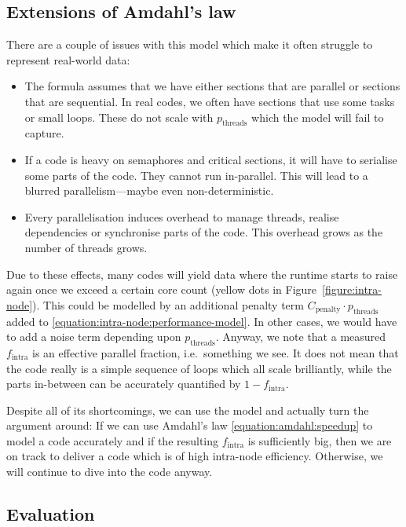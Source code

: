 \subsection{Extensions of Amdahl's law}


There are a couple of issues with this model which make it often struggle to
represent real-world data:

\begin{itemize}
  \item The formula assumes that we have either sections that are parallel or
  sections that are sequential. In real codes, we often have sections that use
  some tasks or small loops. These do not scale with $p_{\text{threads}}$ which
  the model will fail to capture. 
  \item If a code is heavy on semaphores and critical sections, it will have to
  serialise some parts of the code. They cannot run in-parallel. This will lead
  to a blurred parallelism---maybe even non-deterministic.
  \item Every parallelisation induces overhead to manage threads, realise
  dependencies or synchronise parts of the code. This overhead grows as the
  number of threads grows.
\end{itemize}



\noindent
Due to these effects, many codes will yield data where the runtime starts to
raise again once we exceed a certain core count (yellow dots in Figure~\ref{figure:intra-node}).
This could be modelled by an additional penalty term $C_{\text{penalty}} \cdot p_{\text{threads}} $ added to \eqref{equation:intra-node:performance-model}.
In other cases, we would have to add a noise term depending upon
$p_{\text{threads}}$.
Anyway, we note that a measured $f_{\text{intra}}$ is an effective parallel
fraction, i.e.~something we see. 
It does not mean that the code really is a simple sequence of loops which all
scale brilliantly, while the parts in-between can be accurately quantified by
$1-f_{\text{intra}}$.


Despite all of its shortcomings, we can use the model and actually turn the
argument around:
If we can use Amdahl's law \eqref{equation:amdahl:speedup} to model a code
accurately and if the resulting $f_{\text{intra}}$ is sufficiently big, then we
are on track to deliver a code which is of high intra-node efficiency.
Otherwise, we will continue to dive into the code anyway.



\subsection{Evaluation}

